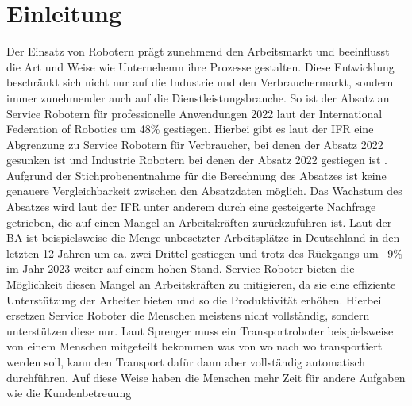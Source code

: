\section{Einleitung}
Der Einsatz von Robotern prägt zunehmend den Arbeitsmarkt und beeinflusst die Art und Weise wie Unternehemn ihre Prozesse gestalten. Diese Entwicklung beschränkt sich nicht nur auf die Industrie und den Verbrauchermarkt, sondern immer zunehmender auch auf die Dienstleistungsbranche. So ist der Absatz an Service Robotern für professionelle Anwendungen 2022 laut der International Federation of Robotics \cite{IFR2023} um 48\% gestiegen. Hierbei gibt es laut der \ac{IFR} eine Abgrenzung zu Service Robotern für Verbraucher, bei denen der Absatz 2022 gesunken ist \cite[S.~37]{WorldRobotics2023} und Industrie Robotern bei denen der Absatz 2022 gestiegen ist \cite[S.~9]{WorldRobotics2023}. Aufgrund der Stichprobenentnahme für die Berechnung des Absatzes ist keine genauere Vergleichbarkeit zwischen den Absatzdaten möglich. Das Wachstum des Absatzes wird laut der \ac{IFR} \cite[S.~36]{WorldRobotics2023} unter anderem durch eine gesteigerte Nachfrage getrieben, die auf einen Mangel an Arbeitskräften zurückzuführen ist. Laut der \ac{BA} \cite{BA2024} ist beispielsweise die Menge unbesetzter Arbeitsplätze in Deutschland in den letzten 12 Jahren um ca. zwei Drittel gestiegen und trotz des Rückgangs um ~9\% im Jahr 2023 weiter auf einem hohen Stand. Service Roboter bieten die Möglichkeit diesen Mangel an Arbeitskräften zu mitigieren, da sie eine effiziente Unterstützung der Arbeiter bieten und so die Produktivität erhöhen. Hierbei ersetzen Service Roboter die Menschen meistens nicht vollständig, sondern unterstützen diese nur. Laut Sprenger \cite[S.~272]{Sprenger2015} muss ein Transportroboter beispielsweise von einem Menschen mitgeteilt bekommen was von wo nach wo transportiert werden soll, kann den Transport dafür dann aber vollständig automatisch durchführen. Auf diese Weise haben die Menschen mehr Zeit für andere Aufgaben wie die Kundenbetreuung

